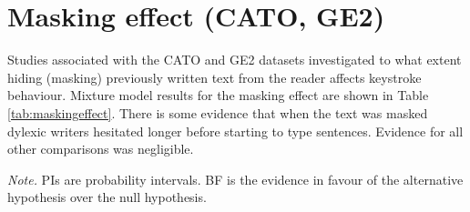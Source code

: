 \documentclass[
  man,floatsintext]{apa7}
\begin{document}
\hypertarget{masking-effect-cato-ge2}{%
\section{Masking effect (CATO, GE2)}\label{masking-effect-cato-ge2}}

Studies associated with the CATO and GE2 datasets investigated to what extent hiding (masking) previously written text from the reader affects keystroke behaviour. Mixture model results for the masking effect are shown in Table \ref{tab:maskingeffect}. There is some evidence that when the text was masked dylexic writers hesitated longer before starting to type sentences. Evidence for all other comparisons was negligible.

\begin{landscape}

\begin{center}
\begin{ThreePartTable}

\begin{TableNotes}[para]
\normalsize{\textit{Note.} PIs are probability intervals. BF is the evidence in favour of the alternative hypothesis over the null hypothesis.}
\end{TableNotes}

\footnotesize{

}
\end{ThreePartTable}
\end{center}
\end{landscape}
\end{document}

